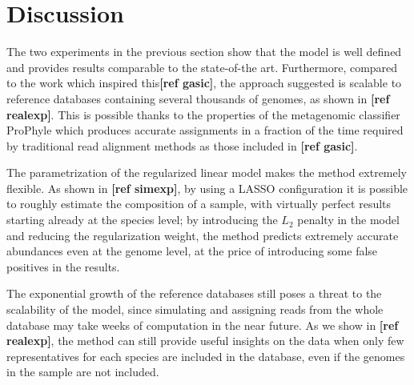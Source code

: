 \section{Discussion}

The two experiments in the previous section show that the model is well defined and provides results comparable to the state-of-the art. Furthermore, compared to the work which inspired this\textbf{[ref gasic]}, the approach suggested is scalable to reference databases containing several thousands of genomes, as shown in \textbf{[ref realexp]}. This is possible thanks to the properties of the metagenomic classifier ProPhyle which produces accurate assignments in a fraction of the time required by traditional read alignment methods as those included in \textbf{[ref gasic]}.

The parametrization of the regularized linear model makes the method extremely flexible. As shown in \textbf{[ref simexp]}, by using a LASSO configuration it is possible to roughly estimate the composition of a sample, with virtually perfect results starting already at the species level; by introducing the $L_2$ penalty in the model and reducing the regularization weight, the method predicts extremely accurate abundances even at the genome level, at the price of introducing some false positives in the results.

The exponential growth of the reference databases still poses a threat to the scalability of the model, since simulating and assigning reads from the whole database may take weeks of computation in the near future. As we show in \textbf{[ref realexp]}, the method can still provide useful insights on the data when only few representatives for each species are included in the database, even if the genomes in the sample are not included.
